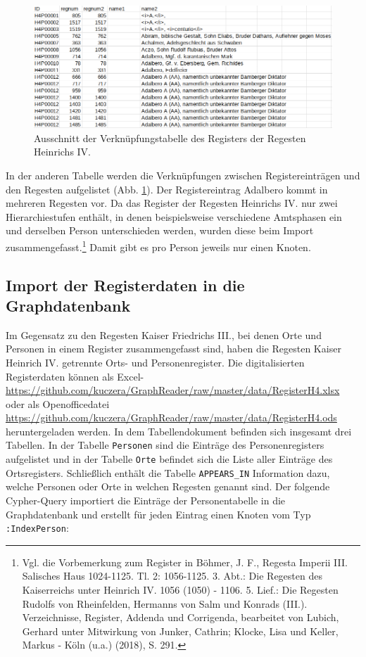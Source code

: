 \documentclass[ngerman,]{scrreprt}
\begin{document}
\begin{figure}
\centering
\includegraphics{Bilder/RI2Graph/RegisterH4-GENANNT.png}
\caption{Ausschnitt der Verknüpfungstabelle des Registers der Regesten Heinrichs IV.} 
\label{verknuepfung}
\end{figure}

In der anderen Tabelle werden die Verknüpfungen zwischen Registereinträgen und den Regesten aufgelistet (Abb. \ref{verknuepfung}). Der Registereintrag Adalbero kommt in mehreren Regesten vor. Da das Register der Regesten Heinrichs IV. nur zwei Hierarchiestufen enthält, in denen beispielsweise verschiedene Amtsphasen ein und derselben Person unterschieden werden, wurden diese beim Import zusammengefasst.\footnote{Vgl. die Vorbemerkung zum Register in Böhmer, J. F., Regesta Imperii III. Salisches Haus 1024-1125. Tl. 2: 1056-1125. 3. Abt.: Die Regesten des Kaiserreichs unter Heinrich IV. 1056 (1050) - 1106. 5. Lief.: Die Regesten Rudolfs von Rheinfelden, Hermanns von Salm und Konrads (III.). Verzeichnisse, Register, Addenda und Corrigenda, bearbeitet von Lubich, Gerhard unter Mitwirkung von Junker, Cathrin; Klocke, Lisa und Keller, Markus - Köln (u.a.) (2018), S. 291.} Damit gibt es pro Person jeweils nur einen Knoten.

\hypertarget{import-der-registerdaten-in-die-graphdatenbank-1}{%
\subsection{Import der Registerdaten in die Graphdatenbank}\label{import-der-registerdaten-in-die-graphdatenbank-1}}

Im Gegensatz zu den Regesten Kaiser Friedrichs III., bei denen Orte und Personen in einem Register zusammengefasst sind, haben die Regesten Kaiser Heinrich IV. getrennte Orts- und Personenregister. Die digitalisierten Registerdaten können als Excel- \url{https://github.com/kuczera/GraphReader/raw/master/data/RegisterH4.xlsx} oder als  Openofficedatei \url{https://github.com/kuczera/GraphReader/raw/master/data/RegisterH4.ods} heruntergeladen werden.  In dem Tabellendokument befinden sich insgesamt drei Tabellen. In der Tabelle \texttt{Personen} sind die Einträge des Personenregisters aufgelistet und in der Tabelle \texttt{Orte} befindet sich die Liste aller Einträge des Ortsregisters. Schließlich enthält die Tabelle \texttt{APPEARS\_IN} Information dazu, welche Personen oder Orte in welchen Regesten genannt sind. Der folgende Cypher-Query importiert die Einträge der Personentabelle in die Graphdatenbank und erstellt für jeden Eintrag einen Knoten vom Typ \texttt{:IndexPerson}:
\end{document}
